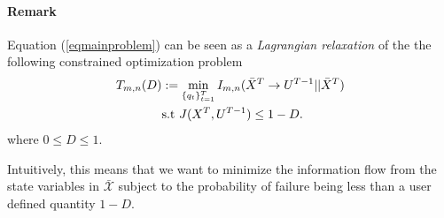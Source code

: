 \paragraph*{Remark} Equation (\ref{eqmainproblem}) can be seen as a \emph{Lagrangian relaxation} of the the following constrained optimization problem
\begin{align}\label{eqn:constopt}
T_{m,n}(D) & := \min_{\{q_t\}_{t=1}^T} I_{m,n}(\bar{X}^T \rightarrow U^{T-1}||\bar{X}^T) \\
& \textrm{s.t } J(X^{T},U^{T-1}) \leq 1 - D. \nonumber
\end{align}
where $0\leq D \leq 1$.

Intuitively, this means that we want to minimize the information flow from the state variables in $\mathcal{\bar{X}}$ subject to the probability of failure being less than a user defined quantity $1-D$. 


